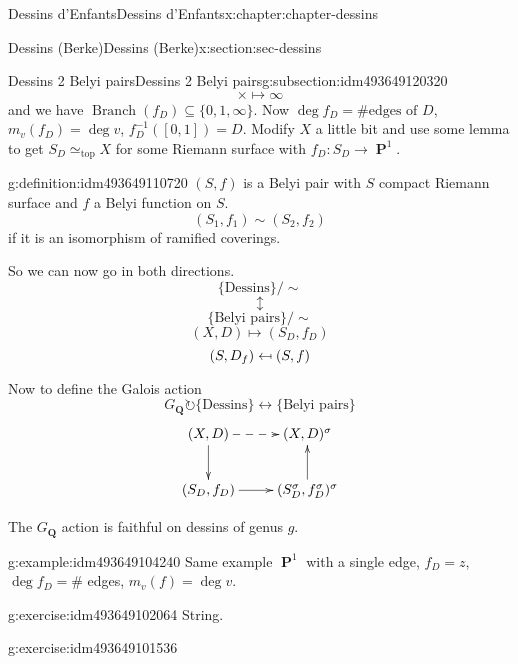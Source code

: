 \documentclass[oneside,10pt,]{book}
\numberwithin{equation}{section}
\newcommand{\lb}{[}
\newcommand{\rb}{]}
\providecommand\mapsfrom{\mathrel{\reflectbox{\ensuremath{\mapsto}}}}
\newcommand{\QQ}{\mathbf{Q}}
\newcommand{\acts}{\circlearrowright}
\DeclareMathOperator{\PP}{\mathbf{P}}
\begin{document}
\begin{chapterptx}{Dessins d'Enfants}{}{Dessins d'Enfants}{}{}{x:chapter:chapter-dessins}
\begin{sectionptx}{Dessins (Berke)}{}{Dessins (Berke)}{}{}{x:section:sec-dessins}
\begin{subsectionptx}{Dessins 2 Belyi pairs}{}{Dessins 2 Belyi pairs}{}{}{g:subsection:idm493649120320}
\begin{equation*}
\times \mapsto\infty
\end{equation*}
and we have \(\operatorname{Branch}(f_D) \subseteq \{0,1,\infty\}\). Now \(\deg f_D = \#\text{edges of }D\), \(m_v(f_D) = \deg v\), \(f_D^{-1}(\lb 0 , 1 \rb) = D\). Modify \(X\) a little bit and use some lemma to get \(S_D \simeq_{\text{top}} X\) for some Riemann surface with \(f_D\colon S_D \to \PP^1\).%
\begin{definition}{}{g:definition:idm493649110720}%
\((S,f)\) is a Belyi pair with \(S\) compact Riemann surface and  \(f\) a Belyi function on \(S\).%
\begin{equation*}
(S_1,f_1) \sim (S_2, f_2)
\end{equation*}
if it is an isomorphism of ramified coverings.%
\end{definition}
So we can now go in both directions.%
\begin{equation*}
\{\text{Dessins}\}/\sim
\end{equation*}
%
\begin{equation*}
\updownarrow
\end{equation*}
%
\begin{equation*}
\{\text{Belyi pairs}\}/\sim
\end{equation*}
%
\begin{equation*}
(X,D) \mapsto (S_D, f_D)
\end{equation*}
%
\begin{equation*}
(S, D_f) \mapsfrom (S,f)
\end{equation*}
%
\par
Now to define the Galois action%
\begin{equation*}
G_\QQ\acts \{\text{Dessins}\}\leftrightarrow \{\text{Belyi pairs}\}
\end{equation*}
%
\begin{equation*}
\xymatrix{
(X,D)\ar[d] \ar@{-->}[r] & (X,D)^\sigma \\
(S_D,f_D)\ar[r] & (S_D^\sigma,f_D^\sigma)^\sigma \ar[u]
}
\end{equation*}
%
\par
The \(G_\QQ\) action is faithful on dessins of genus \(g\).%
\begin{example}{}{g:example:idm493649104240}%
Same example \(\PP^1\) with a single edge, \(f_D  = z\), \(\deg f_D = \#\) edges, \(m_v(f)=  \deg v\).%
\end{example}
\begin{inlineexercise}{}{g:exercise:idm493649102064}%
String.%
\end{inlineexercise}
\begin{inlineexercise}{}{g:exercise:idm493649101536}%

\end{inlineexercise}
\end{subsectionptx}
\end{sectionptx}
\end{chapterptx}
\end{document}
